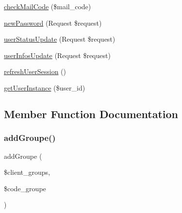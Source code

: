 \begin{DoxyCompactItemize}
\item 
\mbox{\hyperlink{class_app_1_1_http_1_1_controllers_1_1_user_informations_controller_a0f47fece0dea175a9f2b608adbadd0e7}{check\+Mail\+Code}} (\$mail\+\_\+code)
\item 
\mbox{\hyperlink{class_app_1_1_http_1_1_controllers_1_1_user_informations_controller_a9e24de441f06d7cdf6691145c0a057cc}{new\+Password}} (Request \$request)
\item 
\mbox{\hyperlink{class_app_1_1_http_1_1_controllers_1_1_user_informations_controller_a854e4cedc3542e3fdacc7cd8a07d6e86}{user\+Status\+Update}} (Request \$request)
\item 
\mbox{\hyperlink{class_app_1_1_http_1_1_controllers_1_1_user_informations_controller_a489a665ec013cb42ccbac3089027e557}{user\+Infos\+Update}} (Request \$request)
\item 
\mbox{\hyperlink{class_app_1_1_http_1_1_controllers_1_1_user_informations_controller_a0257a835800496e3ed274786e4b7c273}{refresh\+User\+Session}} ()
\item 
\mbox{\hyperlink{class_app_1_1_http_1_1_controllers_1_1_user_informations_controller_ab2f6042ae29a8aa04cc40179ef82fad7}{get\+User\+Instance}} (\$user\+\_\+id)
\end{DoxyCompactItemize}


\subsection{Member Function Documentation}
\mbox{\label{class_app_1_1_http_1_1_controllers_1_1_user_informations_controller_a38b277de903fd5b16def1c1071d34474}} 
\subsubsection{\texorpdfstring{add\+Groupe()}{addGroupe()}}
{\footnotesize\ttfamily add\+Groupe (\begin{DoxyParamCaption}\item[{}]{\$client\+\_\+groups,  }\item[{}]{\$code\+\_\+groupe }\end{DoxyParamCaption})}


